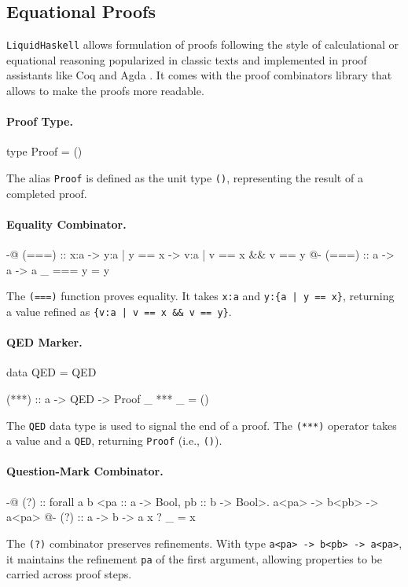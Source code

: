 \subsection{Equational Proofs}
\texttt{LiquidHaskell} allows formulation of proofs following the style of calculational or equational reasoning popularized in classic texts
and implemented in proof assistants like Coq and Agda \cite{vazou2018}.
It comes with the proof combinators library that allows to make the proofs more readable.

\paragraph{Proof Type.}
\begin{code}[label={lst:proof-type}]
	type Proof = ()
\end{code}
The alias \texttt{Proof} is defined as the unit type \texttt{()}, representing the result of a completed proof.

\paragraph{Equality Combinator.}
\begin{code}[label={lst:proof-eq}]
	{-@ (===) :: x:a -> y:{a | y == x} -> {v:a | v == x && v == y} @-}
	(===) :: a -> a -> a
	_ === y = y
\end{code}
The \texttt{(===)} function proves equality. It takes \texttt{x:a} and \texttt{y:\{a | y == x\}}, returning a value refined as \texttt{\{v:a | v == x \&\& v == y\}}.

\paragraph{QED Marker.}
\begin{code}[label={lst:proof-qed}]
	data QED = QED

	(***) :: a -> QED -> Proof
	_ *** _ = ()
\end{code}
The \texttt{QED} data type is used to signal the end of a proof. The \texttt{(***)} operator takes a value and a \texttt{QED}, returning \texttt{Proof} (i.e., \texttt{()}).

\paragraph{Question-Mark Combinator.}
\begin{code}[label={lst:proof-question}]
	{-@ (?) :: forall a b <pa :: a -> Bool, pb :: b -> Bool>. a<pa> -> b<pb> -> a<pa> @-}
	(?) :: a -> b -> a
	x ? _ = x
\end{code}
The \texttt{(?)} combinator preserves refinements. With type \texttt{a<pa> -> b<pb> -> a<pa>}, it maintains the refinement \texttt{pa} of the first argument, allowing properties to be carried across proof steps.

